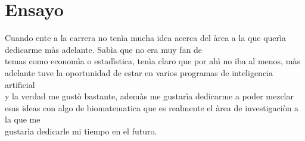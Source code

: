 \documentclass[12pt]{article}
\begin{document}
\section{Ensayo}
\maketitle
Cuando ente a la carrera no tenìa mucha idea acerca del àrea a la que querìa dedicarme màs adelante. Sabìa que no era muy fan de \\
temas como economìa o estadìstica, tenìa claro que por ahì no iba al menos, màs adelante tuve la oportunidad de estar en varios programas de inteligencia artificial \\
y la verdad me gustò bastante, ademàs me gustarìa dedicarme a poder mezclar esas ideas con algo de biomatematica que es realmente el àrea de investigaciòn a la que me \\ 
gustarìa dedicarle mi tiempo en el futuro.
\end{document}
